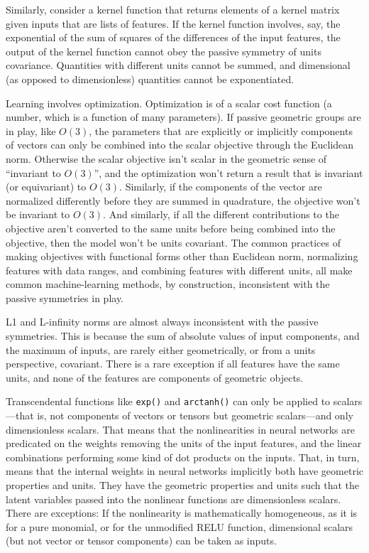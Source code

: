 \documentclass{article}
\theoremstyle{plain}
\theoremstyle{definition}
\theoremstyle{remark}
\begin{document}
Similarly, consider a kernel function that returns elements of a kernel matrix given inputs that are lists of features.
If the kernel function involves, say, the exponential of the sum of squares of the differences of the input features, the output of the kernel function cannot obey the passive symmetry of units covariance.
Quantities with different units cannot be summed, and dimensional (as opposed to dimensionless) quantities cannot be exponentiated.

Learning involves optimization.
Optimization is of a scalar cost function (a number, which is a function of many parameters).
If passive geometric groups are in play, like $O(3)$, the parameters that are explicitly or implicitly components of vectors can only be combined into the scalar objective through the Euclidean norm.
Otherwise the scalar objective isn't scalar in the geometric sense of ``invariant to $O(3)$'', and the optimization won't return a result that is invariant (or equivariant) to $O(3)$.
Similarly, if the components of the vector are normalized differently before they are summed in quadrature, the objective won't be invariant to $O(3)$.
And similarly, if all the different contributions to the objective aren't converted to the same units before being combined into the objective, then the model won't be units covariant.
The common practices of making objectives with functional forms other than Euclidean norm, normalizing features with data ranges, and combining features with different units, all make common machine-learning methods, by construction, inconsistent with the passive symmetries in play.

L1 and L-infinity norms are almost always inconsistent with the passive symmetries.
This is because the sum of absolute values of input components, and the maximum of inputs, are rarely either geometrically, or from a units perspective, covariant.
There is a rare exception if all features have the same units, and none of the features are components of geometric objects.

Transcendental functions like \texttt{exp()} and \texttt{arctanh()} can only be applied to scalars---that is, not components of vectors or tensors but geometric scalars---and only dimensionless scalars.
That means that the nonlinearities in neural networks are predicated on the weights removing the units of the input features, and the linear combinations performing some kind of dot products on the inputs.
That, in turn, means that the internal weights in neural networks implicitly both have geometric properties and units.
They have the geometric properties and units such that the latent variables passed into the nonlinear functions are dimensionless scalars.
There are exceptions:
If the nonlinearity is mathematically homogeneous, as it is for a pure monomial, or for the unmodified RELU function, dimensional scalars (but not vector or tensor components) can be taken as inputs.
\end{document}
